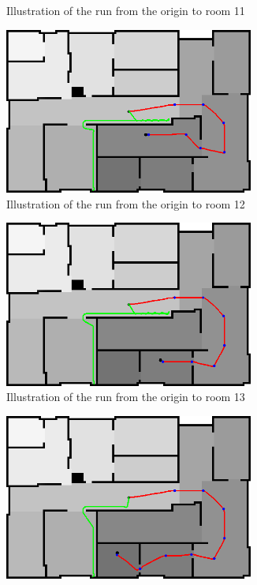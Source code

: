 \documentclass[../Head/Main.tex]{subfiles}
\begin{document}
\begin{figure}[H]
\begin{subfigure}[b]{0.49\textwidth}
    \caption{Illustration of the run from the origin to room 11}
    \label{fig:Test11}
  \end{subfigure}
  \hfill
  \begin{subfigure}[b]{0.49\textwidth}
    \centering
    \includegraphics[width=0.9\textwidth]{brushfireAndBugTest12}
    \caption{Illustration of the run from the origin to room 12}
    \label{fig:Test12}
  \end{subfigure}
  \begin{subfigure}[b]{0.49\textwidth}
    \centering
    \includegraphics[width=0.9\textwidth]{brushfireAndBugTest13}
    \caption{Illustration of the run from the origin to room 13}
    \label{fig:Test13}
  \end{subfigure}
  \hfill
  \begin{subfigure}[b]{0.49\textwidth}
    \centering
    \includegraphics[width=0.9\textwidth]{brushfireAndBugTest14}

\end{subfigure}
\end{figure}
\end{document}
